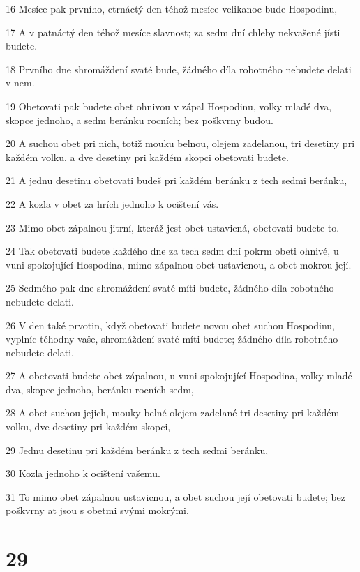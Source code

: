 \par 16 Mesíce pak prvního, ctrnáctý den téhož mesíce velikanoc bude Hospodinu,
\par 17 A v patnáctý den téhož mesíce slavnost; za sedm dní chleby nekvašené jísti budete.
\par 18 Prvního dne shromáždení svaté bude, žádného díla robotného nebudete delati v nem.
\par 19 Obetovati pak budete obet ohnivou v zápal Hospodinu, volky mladé dva, skopce jednoho, a sedm beránku rocních; bez poškvrny budou.
\par 20 A suchou obet pri nich, totiž mouku belnou, olejem zadelanou, tri desetiny pri každém volku, a dve desetiny pri každém skopci obetovati budete.
\par 21 A jednu desetinu obetovati budeš pri každém beránku z tech sedmi beránku,
\par 22 A kozla v obet za hrích jednoho k ocištení vás.
\par 23 Mimo obet zápalnou jitrní, kteráž jest obet ustavicná, obetovati budete to.
\par 24 Tak obetovati budete každého dne za tech sedm dní pokrm obeti ohnivé, u vuni spokojující Hospodina, mimo zápalnou obet ustavicnou, a obet mokrou její.
\par 25 Sedmého pak dne shromáždení svaté míti budete, žádného díla robotného nebudete delati.
\par 26 V den také prvotin, když obetovati budete novou obet suchou Hospodinu, vyplníc téhodny vaše, shromáždení svaté míti budete; žádného díla robotného nebudete delati.
\par 27 A obetovati budete obet zápalnou, u vuni spokojující Hospodina, volky mladé dva, skopce jednoho, beránku rocních sedm,
\par 28 A obet suchou jejich, mouky belné olejem zadelané tri desetiny pri každém volku, dve desetiny pri každém skopci,
\par 29 Jednu desetinu pri každém beránku z tech sedmi beránku,
\par 30 Kozla jednoho k ocištení vašemu.
\par 31 To mimo obet zápalnou ustavicnou, a obet suchou její obetovati budete; bez poškvrny at jsou s obetmi svými mokrými.

\chapter{29}

